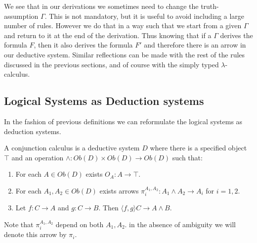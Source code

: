 We see that in our derivations we sometimes need to change the truth-assumption $\Gamma$. This is not mandatory, but it is useful to avoid including a large number of rules. However we do that in a way such that we start from a given $\Gamma$ and return to it at the end of the derivation. Thus knowing that if a $\Gamma$ derives the formula $F$, then it also derives the formula $F'$ and therefore there is an arrow in our deductive system. Similar reflections can be made with the rest of the rules discussed in the previous sections, and of course with the simply typed $\lambda$-calculus. \\



\subsection{Logical Systems as Deduction systems}
In  the fashion of previous definitions we can reformulate the logical systems as deduction systems.\\
\begin{definition}
  A conjunction calculus is a deductive system $D$ where there is a specified object $\top$ and an operation $\land: Ob(D)\times Ob(D) \to Ob(D)$ such that:
  \begin{enumerate}
  \item For each $A\in Ob(D)$ exists $O_A:A\to \top$.
  \item For each $A_1,A_2\in Ob(D)$ exists arrows $\pi_i^{A_1,A_2}: A_1 \land A_2 \to A_i$ for $i=1,2$.
  \item Let $f:C\to A$ and $g:C\to B$. Then $\langle f,g\rangle C\to A\land B$.
  \end{enumerate}
\end{definition}

Note that $\pi_i^{A_1,A_2}$ depend on both $A_1,A_2$. in the absence of ambiguity we will denote this arrow by $\pi_i$.

